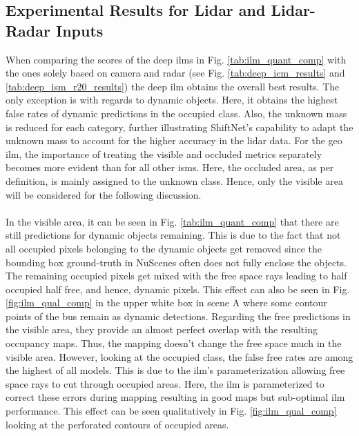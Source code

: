 \subsection{Experimental Results for Lidar and Lidar-Radar Inputs}
\label{subsec:exp_lidar_fusion_in_deep_isms}
When comparing the scores of the deep \gls{ilm}s in Fig. \ref{tab:ilm_quant_comp} with the ones solely based on camera and radar (see Fig. \ref{tab:deep_icm_results} and \ref{tab:deep_ism_r20_results}) the deep \gls{ilm} obtains the overall best results. The only exception is with regards to dynamic objects. Here, it obtains the highest false rates of dynamic predictions in the occupied class. Also, the unknown mass is reduced for each category, further illustrating ShiftNet's capability to adapt the unknown mass to account for the higher accuracy in the lidar data. For the geo \gls{ilm}, the importance of treating the visible and occluded metrics separately becomes more evident than for all other \gls{ism}s. Here, the occluded area, as per definition, is mainly assigned to the unknown class. Hence, only the visible area will be considered for the following discussion.
\\\\
In the visible area, it can be seen in Fig. \ref{tab:ilm_quant_comp} that there are still predictions for dynamic objects remaining. This is due to the fact that not all occupied pixels belonging to the dynamic objects get removed since the bounding box ground-truth in NuScenes often does not fully enclose the objects. The remaining occupied pixels get mixed with the free space rays leading to half occupied half free, and hence, dynamic pixels. This effect can also be seen in Fig. \ref{fig:ilm_qual_comp} in the upper white box in scene A where some contour points of the bus remain as dynamic detections. Regarding the free predictions in the visible area, they provide an almost perfect overlap with the resulting occupancy maps. Thus, the mapping doesn't change the free space much in the visible area. However, looking at the occupied class, the false free rates are among the highest of all models. This is due to the \gls{ilm}'s parameterization allowing free space rays to cut through occupied areas. Here, the \gls{ilm} is parameterized to correct these errors during mapping resulting in good maps but sub-optimal \gls{ilm} performance. This effect can be seen qualitatively in Fig. \ref{fig:ilm_qual_comp} looking at the perforated contours of occupied areas.
\\\\

